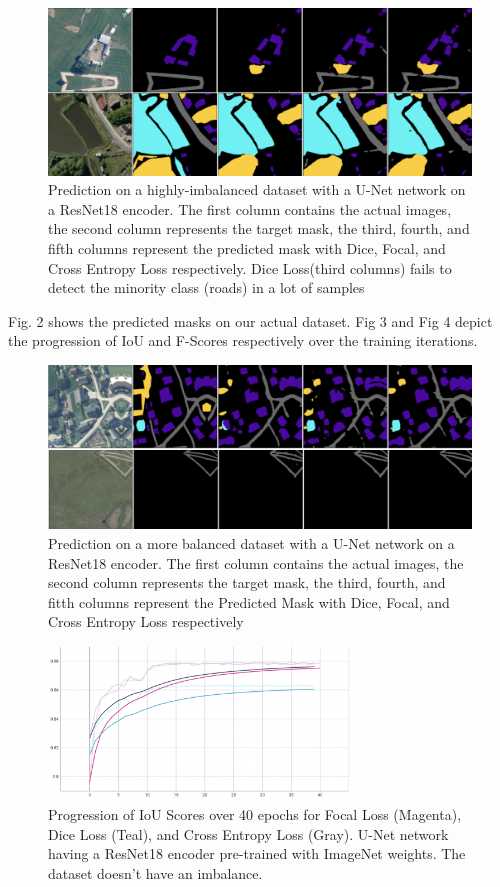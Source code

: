 \documentclass[conference]{IEEEtran}
\begin{document}
\begin{figure}
    \centering
    \includegraphics[width=\textwidth]{no-roads-loss/2-images.png}
    \caption{Prediction on a highly-imbalanced dataset with a U-Net network on a ResNet18 encoder. The first column contains the actual images, the second column represents the target mask, the third, fourth, and fifth columns represent the predicted mask with Dice, Focal, and Cross Entropy Loss respectively. Dice Loss(third columns) fails to detect the minority class (roads) in a lot of samples}
\end{figure}

Fig. 2 shows the predicted masks on our actual dataset. Fig 3 and Fig 4 depict the progression of IoU and F-Scores respectively over the training iterations.
\begin{figure}
    \centering
    \includegraphics[width=\textwidth]{roads-losses/with-roads.png}
    \caption{Prediction on a more balanced dataset with a U-Net network on a ResNet18 encoder. The first column contains the actual images, the second column represents the target mask, the third, fourth, and fitth columns represent the Predicted Mask with Dice, Focal, and Cross Entropy Loss respectively}
\end{figure}

\begin{figure}[!hb]
    \centering
    \includegraphics[width=80mm, scale=2.5]{roads-losses/three-losses-iou.png}
    \caption{Progression of IoU Scores over 40 epochs for Focal Loss (Magenta), Dice Loss (Teal), and Cross Entropy Loss (Gray). U-Net network having a ResNet18 encoder pre-trained with ImageNet weights. The dataset doesn't have an imbalance. }
\end{figure}
\end{document}

